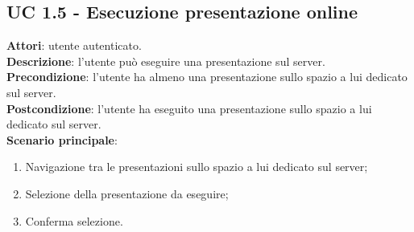 \subsection{UC 1.5 - Esecuzione presentazione online}{
	\label{uc1.5}
	\textbf{Attori}: utente autenticato.\\
	\textbf{Descrizione}: l'utente può eseguire una presentazione sul server.\\
	\textbf{Precondizione}: l'utente ha almeno una presentazione sullo spazio a lui dedicato sul server.\\
	\textbf{Postcondizione}: l'utente ha eseguito una presentazione sullo spazio a lui dedicato sul server.\\
	\textbf{Scenario principale}:
	\begin{enumerate}
		\item Navigazione tra le presentazioni sullo spazio a lui dedicato sul server;
		\item Selezione della presentazione da eseguire;
		\item Conferma selezione.
	\end{enumerate}
}
